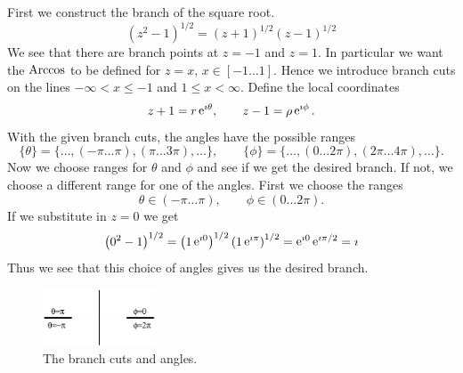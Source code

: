 {\begin{Solution}
  First we construct the branch of the square root.
  \[
  \left( z^2 - 1 \right)^{1/2} = (z+1)^{1/2}  (z-1)^{1/2}
  \]
  We see that there are branch points at $z = -1$ and $z = 1$.  
  In particular we want the $\mathop{\mathrm{Arccos}}\nolimits$ to be defined for $z = x$, 
  $x \in [-1 \ldots 1]$.  Hence we introduce
  branch cuts on the lines $-\infty < x \leq -1$ and $1 \leq x < \infty$.
  Define the local coordinates
  \[
  z + 1 = r \mathop{\mathrm{e}}\nolimits^{\imath \theta}, \qquad z - 1 = \rho \mathop{\mathrm{e}}\nolimits^{\imath \phi}.
  \]
  With the given branch cuts, the angles have the possible ranges
  \[
  \{\theta\}= \{ \ldots, (-\pi \ldots \pi), (\pi \ldots 3 \pi), \ldots \}, \qquad
  \{\phi\}= \{ \ldots, (0 \ldots 2 \pi), (2 \pi \ldots 4 \pi), \ldots \}.
  \]
  Now we choose ranges for $\theta$ and $\phi$ and see if we get the desired
  branch.  If not, we choose a different range for one of the angles.
  First we choose the ranges
  \[
  \theta \in (-\pi \ldots \pi), \qquad \phi \in (0 \ldots 2 \pi).
  \]
  If we substitute in $z = 0$ we get
  \[
  \left( 0^2 - 1 \right)^{1/2} = \left( 1 \mathop{\mathrm{e}}\nolimits^{\imath 0} \right)^{1/2}  
  \left( 1 \mathop{\mathrm{e}}\nolimits^{\imath \pi} \right)^{1/2}
  = \mathop{\mathrm{e}}\nolimits^{\imath 0}  \mathop{\mathrm{e}}\nolimits^{\imath \pi/2}
  = \imath
  \]
  Thus we see that this choice of angles gives us the desired branch.
  \begin{figure}[htbp!]
    \begin{center}
      \includegraphics[width=0.3\textwidth]{fcv/function/arccosbc}
    \end{center}
    \caption{The branch cuts and angles.}
    \label{arccosbc}
  \end{figure}


\end{Solution}}
